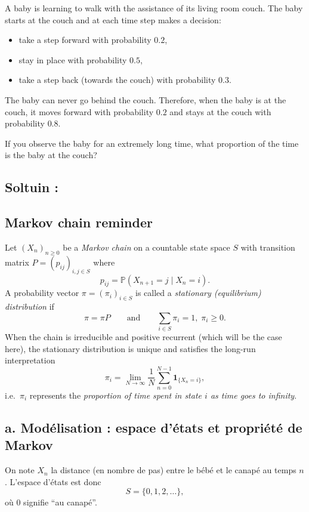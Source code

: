 \begin{exerciseBox}
A baby is learning to walk with the assistance of its living room couch. The baby starts at the couch and at each time step makes a decision:
\begin{itemize}
  \item take a step forward with probability $0.2$,
  \item stay in place with probability $0.5$,
  \item take a step back (towards the couch) with probability $0.3$.
\end{itemize}
The baby can never go behind the couch. Therefore, when the baby is at the couch, it moves forward with probability $0.2$ and stays at the couch with probability $0.8$.

If you observe the baby for an extremely long time, what proportion of the time is the baby at the couch?
\end{exerciseBox}


\subsection*{Soltuin :}


\subsection*{Markov chain reminder}

Let $(X_n)_{n\ge 0}$ be a \emph{Markov chain} on a countable state space $S$ with transition matrix
$P=(p_{ij})_{i,j\in S}$ where
\[
p_{ij}=\mathbb{P}(X_{n+1}=j\mid X_n=i).
\]
A probability vector $\pi=(\pi_i)_{i\in S}$ is called a \emph{stationary (equilibrium) distribution} if
\[
\pi = \pi P
\qquad\text{and}\qquad
\sum_{i\in S}\pi_i=1,\;\pi_i\ge 0.
\]
When the chain is irreducible and positive recurrent (which will be the case here), the stationary
distribution is unique and satisfies the long-run interpretation
\[
\pi_i = \lim_{N\to\infty}\frac{1}{N}\sum_{n=0}^{N-1}\mathbf{1}_{\{X_n=i\}},
\]
i.e.\ $\pi_i$ represents the \emph{proportion of time spent in state $i$ as time goes to infinity}.



\subsection*{a. Mod\'elisation : espace d'\'etats et propri\'et\'e de Markov}

On note $X_n$ la distance (en nombre de pas) entre le b\'eb\'e et le canap\'e au temps $n$.
L'espace d'\'etats est donc
\[
S=\{0,1,2,\dots\},
\]
o\`u $0$ signifie ``au canap\'e''.


